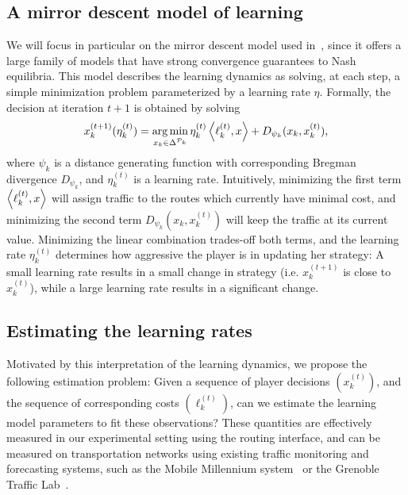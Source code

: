 \documentclass{sig-alternate-ipsn13}
\begin{document}
\subsection{A mirror descent model of learning}
We will focus in particular on the mirror descent model used in~\cite{krichene2015MD}, since it offers a large family of models that have strong convergence guarantees to Nash equilibria. This model describes the learning dynamics as solving, at each step, a simple minimization problem parameterized by a learning rate $\eta$. Formally, the decision at iteration $t+1$ is obtained by solving
\[
x^{(t+1)}_k(\eta^{(t)}_k) = \operatorname*{arg\,min}_{x_k \in \Delta^{\mathcal{P}_k}} \eta^{(t)}_k\left\langle \ell^{(t)}_k, x \right\rangle + D_{\psi_k}(x_k, x^{(t)}_k),
\]
where $\psi_k$ is a distance generating function with corresponding Bregman divergence $D_{\psi_k}$, and $\eta^{(t)}_k$ is a learning rate. Intuitively, minimizing the first term $\left\langle \ell^{(t)}_k, x \right\rangle$ will assign traffic to the routes which currently have minimal cost, and minimizing the second term $D_{\psi_k}(x_k, x^{(t)}_k)$ will keep the traffic at its current value. Minimizing the linear combination trades-off both terms, and the learning rate $\eta_k^{(t)}$ determines how aggressive the player is in updating her strategy: A small learning rate results in a small change in strategy (i.e. $x^{(t+1)}_k$ is close to $x_k^{(t)}$), while a large learning rate results in a significant change.

\subsection{Estimating the learning rates}
Motivated by this interpretation of the learning dynamics, we propose the following estimation problem: Given a sequence of player decisions $(x^{(t)}_k)$, and the sequence of corresponding costs $(\ell_k^{(t)})$, can we estimate the learning model parameters to fit these observations? These quantities are effectively measured in our experimental setting using the routing interface, and can be measured on transportation networks using existing traffic monitoring and forecasting systems, such as the Mobile Millennium system~\cite{bayen2011mobile} or the Grenoble Traffic Lab~\cite{canudasdewit2015grenoble}.
\end{document}
